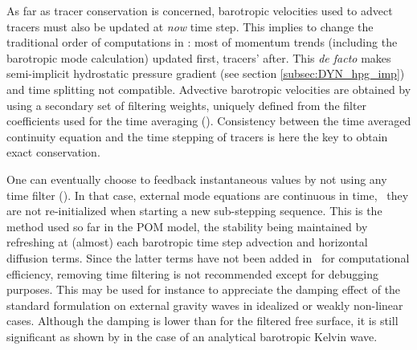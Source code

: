 \documentclass[../main/NEMO_manual]{subfiles}
\begin{document}
As far as tracer conservation is concerned,
barotropic velocities used to advect tracers must also be updated at \textit{now} time step.
This implies to change the traditional order of computations in \NEMO:
most of momentum trends (including the barotropic mode calculation) updated first, tracers' after.
This \textit{de facto} makes semi-implicit hydrostatic pressure gradient
(see section \autoref{subsec:DYN_hpg_imp})
and time splitting not compatible.
Advective barotropic velocities are obtained by using a secondary set of filtering weights,
uniquely defined from the filter coefficients used for the time averaging (\citet{shchepetkin.mcwilliams_OM05}).
Consistency between the time averaged continuity equation and the time stepping of tracers is here the key to
obtain exact conservation.


One can eventually choose to feedback instantaneous values by not using any time filter
().
In that case, external mode equations are continuous in time,
\ie\ they are not re-initialized when starting a new sub-stepping sequence.
This is the method used so far in the POM model, the stability being maintained by
refreshing at (almost) each barotropic time step advection and horizontal diffusion terms.
Since the latter terms have not been added in \NEMO\ for computational efficiency,
removing time filtering is not recommended except for debugging purposes.
This may be used for instance to appreciate the damping effect of the standard formulation on
external gravity waves in idealized or weakly non-linear cases.
Although the damping is lower than for the filtered free surface,
it is still significant as shown by \citet{levier.treguier.ea_rpt07} in the case of an analytical barotropic Kelvin wave.
\end{document}
